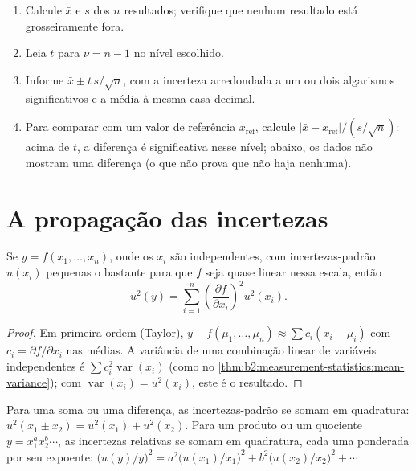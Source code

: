 \begin{method}\label{met:b2:measurement-statistics:confidence-interval}
\begin{enumerate}
  \item Calcule $\bar x$ e $s$ dos $n$ resultados; verifique que nenhum resultado está grosseiramente fora.
  \item Leia $t$ para $\nu = n - 1$ no nível escolhido.
  \item Informe $\bar x \pm t\,s/\sqrt n$, com a incerteza arredondada a um ou dois algarismos
        significativos e a média à mesma casa decimal.
  \item Para comparar com um valor de referência $x_{\mathrm{ref}}$, calcule $|\bar x - x_{\mathrm{ref}}|/(s/\sqrt
        n)$: acima de $t$, a diferença é significativa nesse nível; abaixo, os dados não mostram uma
        diferença (o que não prova que não haja nenhuma).
\end{enumerate}
\end{method}

\section{A propagação das incertezas}

\begin{theorem}\label{thm:b2:measurement-statistics:propagation}
Se $y = f(x_1, \dots, x_n)$, onde os $x_i$ são independentes, com incertezas-padrão $u(x_i)$ pequenas
o bastante para que $f$ seja quase linear nessa escala, então
\begin{equation*}
u^2(y) = \sum_{i=1}^{n}\left(\frac{\partial f}{\partial x_i}\right)^2 u^2(x_i).
\end{equation*}
\end{theorem}

\begin{proof}
Em primeira ordem (Taylor), $y - f(\mu_1, \dots, \mu_n) \approx \sum c_i(x_i - \mu_i)$ com $c_i = \partial
f/\partial x_i$ nas médias. A variância de uma combinação linear de variáveis independentes é
$\sum c_i^2\operatorname{var}(x_i)$ (como no \cref{thm:b2:measurement-statistics:mean-variance}); com
$\operatorname{var}(x_i) = u^2(x_i)$, este é o resultado.
\end{proof}

\begin{corollary}\label{cor:b2:measurement-statistics:products}
Para uma soma ou uma diferença, as incertezas-padrão se somam em quadratura: $u^2(x_1 \pm x_2) = u^2(x_1) +
u^2(x_2)$. Para um produto ou um quociente $y = x_1^{a}x_2^{b}\cdots$, as incertezas relativas se somam
em quadratura, cada uma ponderada por seu expoente: $\bigl(u(y)/y\bigr)^2 = a^2\bigl(u(x_1)/x_1\bigr)^2 +
b^2\bigl(u(x_2)/x_2\bigr)^2 + \cdots$
\end{corollary}

